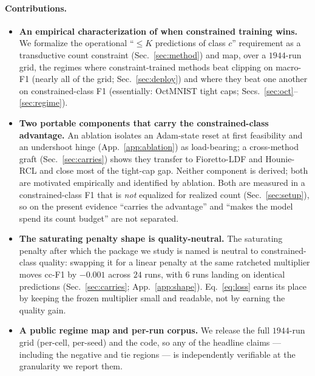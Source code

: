 \documentclass[10pt]{article}
\begin{document}
\paragraph{Contributions.}
\begin{itemize}\itemsep2pt
  \item \textbf{An empirical characterization of when constrained training
  wins.} We formalize the operational ``$\le K$ predictions of class $c$''
  requirement as a transductive count constraint (Sec.~\ref{sec:method}) and
  map, over a $1944$-run grid, the regimes where constraint-trained methods
  beat clipping on macro-F1 (nearly all of the grid;
  Sec.~\ref{sec:deploy}) and where they beat one another on
  constrained-class F1 (essentially: OctMNIST tight caps;
  Secs.~\ref{sec:oct}--\ref{sec:regime}).
  \item \textbf{Two portable components that carry the constrained-class advantage.}
  An ablation isolates an Adam-state reset at first feasibility and an
  undershoot hinge (App.~\ref{app:ablation}) as load-bearing;
  a cross-method graft (Sec.~\ref{sec:carries}) shows they transfer to
  Fioretto-LDF \citep{fioretto2020lagrangian} and Hounie-RCL
  \citep{hounie2023resilient} and close most of the tight-cap gap. Neither
  component is derived; both are motivated empirically and identified by
  ablation.{\color{blue} Both are measured in a constrained-class F1 that is
  \emph{not} equalized for realized count (Sec.~\ref{sec:setup}), so on the
  present evidence ``carries the advantage'' and ``makes the model spend its
  count budget'' are not separated.}
  \item \textbf{The saturating penalty shape is quality-neutral.} The
  saturating penalty after which the package we study is named is neutral
  to constrained-class quality: swapping it for a linear penalty at the
  same ratcheted multiplier moves cc-F1 by $-0.001$ across $24$ runs,
  with $6$ runs landing on identical predictions
  (Sec.~\ref{sec:carries}; App.~\ref{app:shape}). Eq.~\eqref{eq:loss}
  earns its place by keeping the frozen multiplier small and readable,
  not by earning the quality gain.
  \item \textbf{A public regime map and per-run corpus.} We release the
  full $1944$-run grid (per-cell, per-seed) and the code, so any of the
  headline claims --- including the negative and tie regions --- is
  independently verifiable at the granularity we report them.
\end{itemize}

\end{document}
